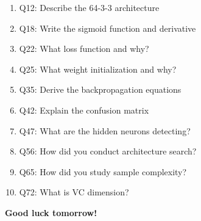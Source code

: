 \documentclass[11pt,a4paper]{article}
\begin{document}
\begin{tcolorbox}[tipbox, title=\textbf{Top 10 Most Likely Viva Questions}]
\begin{enumerate}[nosep]
    \item Q12: Describe the 64-3-3 architecture
    \item Q18: Write the sigmoid function and derivative
    \item Q22: What loss function and why?
    \item Q25: What weight initialization and why?
    \item Q35: Derive the backpropagation equations
    \item Q42: Explain the confusion matrix
    \item Q47: What are the hidden neurons detecting?
    \item Q56: How did you conduct architecture search?
    \item Q65: How did you study sample complexity?
    \item Q72: What is VC dimension?
\end{enumerate}
\end{tcolorbox}

\begin{center}
\textbf{Good luck tomorrow!}
\end{center}
\end{document}
